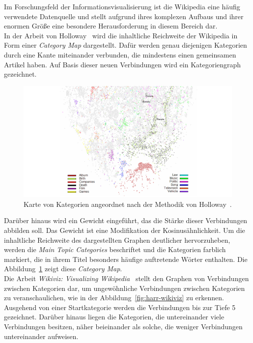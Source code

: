 
Im Forschungsfeld der Informationsvisualisierung ist die Wikipedia eine häufig verwendete Datenquelle und stellt aufgrund ihres komplexen Aufbaus und ihrer enormen Größe eine besondere Herausforderung in diesem Bereich dar.\\
In der Arbeit von Holloway~\cite{holloway2007analyzing} wird die inhaltliche Reichweite der Wikipedia in Form einer \emph{Category Map} dargestellt.
Dafür werden genau diejenigen Kategorien durch eine Kante miteinander verbunden, die mindestens einen gemeinsamen Artikel haben. Auf Basis dieser neuen Verbindungen wird ein Kategoriengraph gezeichnet.
\begin{figure}[H]
    \centering
    \includegraphics[scale=.14]{images/hol-wikivis3}
    \caption{Karte von Kategorien angeordnet nach der Methodik von Holloway~\cite{holloway2007analyzing}.}
    \label{fig:hol-wikivis}
\end{figure}
Darüber hinaus wird ein Gewicht eingeführt, das die Stärke dieser Verbindungen abbilden soll.
Das Gewicht ist eine Modifikation der Kosinusähnlichkeit.
Um die inhaltliche Reichweite des dargestellten Graphen deutlicher hervorzuheben, werden die \emph{Main Topic Categories} beschriftet und die Kategorien farblich markiert, die in ihrem Titel besonders häufige auftretende Wörter enthalten.
Die Abbildung~\ref{fig:hol-wikivis} zeigt diese \emph{Category Map}.\\
Die Arbeit \emph{Wikiviz: Visualizing Wikipedia}~\cite{harrison2006wikiviz} stellt den Graphen von Verbindungen zwischen Kategorien dar, um ungewöhnliche Verbindungen zwischen Kategorien zu veranschaulichen, wie in der Abbildung~\ref{fig:harr-wikiviz} zu erkennen.
Ausgehend von einer Startkategorie werden die Verbindungen bis zur Tiefe 5 gezeichnet.
Darüber hinaus liegen die Kategorien, die untereinander viele Verbindungen besitzen, näher beieinander als solche, die weniger Verbindungen untereinander aufweisen.

